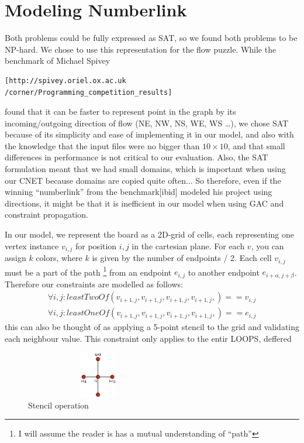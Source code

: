 \documentclass[journal]{IEEEtran}
\begin{document}
\section*{Modeling Numberlink}
Both problems could be fully expressed as SAT, so we found both problems to
be NP-hard. We chose to use this representation for the flow puzzle. 
While the benchmark of Michael Spivey 
\small\begin{verbatim}
[http://spivey.oriel.ox.ac.uk
/corner/Programming_competition_results]\end{verbatim}
\normalsize
found that it can be faster to represent point in the graph by its
incoming/outgoing direction of flow (NE, NW, NS, WE, WS \dots), 
we chose SAT because of its simplicity and ease of implementing it in our
model, and also with the knowledge that the input files were no bigger than
$10 \times 10$, and that small differences in performance is not critical to our evaluation.
Also, the SAT formulation meant that we had small domains, which is important
when using our CNET because domains are copied quite often... So therefore, 
even if the winning ``numberlink'' from the benchmark[ibid] modeled 
his project using directions, it might be that it is inefficient in 
our model when using GAC and constraint propagation.

In our model, we represent the board as a 2D-grid of cells, each representing one
vertex instance $v_{i,j}$ for position $i,j$ in the cartesian plane.
For each $v$, you can assign $k$ colors, where $k$ is given by
the number of endpoints / 2. 
Each cell $v_{i,j}$ must be a part of the path
\footnote{I will assume the reader is has a mutual understanding of ``path''}
from an endpoint $e_{i,j}$ to another endpoint $e_{i+\alpha,j+\beta}$.
Therefore our constraints are modelled as follows:
\begin{align}
    \forall{i,j}: leastTwoOf( v_{i+1,j},v_{i+1,j},v_{i+1,j},v_{i+1,j}, ) == v_{i,j} \\   %
    \forall{i,j}: leastOneOf( v_{i+1,j},v_{i+1,j},v_{i+1,j},v_{i+1,j}, ) == e_{i,j}
\end{align}
this can also be thought of as applying a 5-point stencil to the grid
and validating each neighbour value. This constraint only applies to the entir
LOOPS, deffered

\begin{figure}[Hb]
\centering
    \includegraphics[height=2cm,keepaspectratio,width=2.5in]{stencil.jpg}
\caption{Stencil operation}
\label{fig:stencil}
\end{figure}
\end{document}
